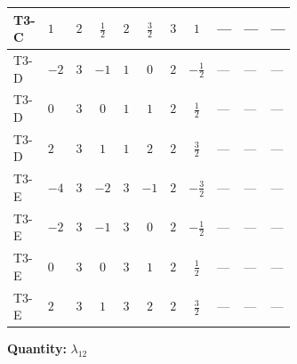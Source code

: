 \documentclass[8pt]{article}
\begin{document}
\begin{landscape}
\begin{longtable}{@{}llcccccc >{\raggedright\arraybackslash}p{0.21\linewidth} >{\raggedright\arraybackslash}p{0.21\linewidth} >{\raggedright\arraybackslash}p{0.21\linewidth}@{}}
\midrule
T3-C & $1$ & $2$ & $\frac{1}{2}$ & $2$ & $\frac{3}{2}$ & $3$ & $1$ & --- & --- & --- \\
\midrule
T3-D & $-2$ & $3$ & $-1$ & $1$ & $0$ & $2$ & $-\frac{1}{2}$ & --- & --- & --- \\
\midrule
T3-D & $0$ & $3$ & $0$ & $1$ & $1$ & $2$ & $\frac{1}{2}$ & --- & --- & --- \\
\midrule
T3-D & $2$ & $3$ & $1$ & $1$ & $2$ & $2$ & $\frac{3}{2}$ & --- & --- & --- \\
\midrule
T3-E & $-4$ & $3$ & $-2$ & $3$ & $-1$ & $2$ & $-\frac{3}{2}$ & --- & --- & --- \\
\midrule
T3-E & $-2$ & $3$ & $-1$ & $3$ & $0$ & $2$ & $-\frac{1}{2}$ & --- & --- & --- \\
\midrule
T3-E & $0$ & $3$ & $0$ & $3$ & $1$ & $2$ & $\frac{1}{2}$ & --- & --- & --- \\
\midrule
T3-E & $2$ & $3$ & $1$ & $3$ & $2$ & $2$ & $\frac{3}{2}$ & --- & --- & --- \\
\midrule
\bottomrule
\end{longtable}
\clearpage
\noindent\textbf{Quantity: }$\lambda_{12}$\par\smallskip

\end{landscape}
\end{document}
